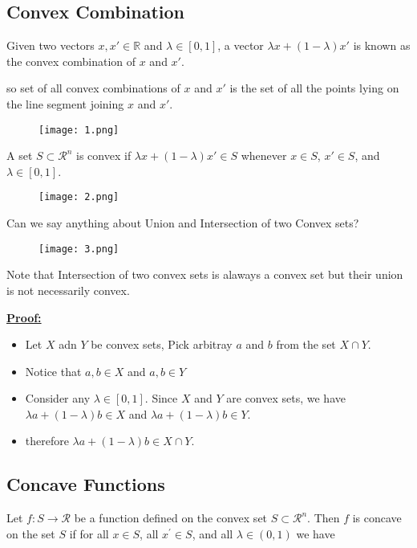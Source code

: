 \documentclass[12pt,a4paper]{article}
\begin{document}
 \subsection{Convex Combination} 
  Given two vectors \(x,x' \in \mathbb{R}\) and \(\lambda \in [0,1]\), a vector \(\lambda x +
  (1-\lambda)x'\) is known as the convex combination of \(x\) and \(x'\).      
 
  so set of all convex combinations of \(x\) and \(x'\) is the set of all the points lying on
  the line segment joining \(x\) and \(x'\).
  
  \begin{figure}[ht]
      \centering
      \texttt{[image: 1.png]}
  \end{figure}
  
  A set \(S \subset \mathcal{R}^n\) is convex if \(\lambda x + (1-\lambda)x' \in S\) whenever 
  \(x \in S\), \(x' \in S\), and \(\lambda \in [0,1]\).
  
  \begin{figure}[ht]
      \centering
      \texttt{[image: 2.png]}
  \end{figure}
  \pagebreak

  Can we say anything about Union and Intersection of two Convex sets?
  \begin{figure}[H]
      \centering
      \texttt{[image: 3.png]}
  \end{figure}

  Note that Intersection of two convex sets is alaways a convex set but their union is not
  necessarily convex.

  \textbf{\underline{Proof:}} 
  \begin{itemize}
    \item Let \(X\) adn \(Y\) be convex sets, Pick arbitray \(a\) and \(b\) from the set \(X 
    \cap Y\).
    \item Notice that \(a,b \in X\) and \(a,b \in Y\)
    \item Consider any \(\lambda \in [0,1]\). Since \(X\) and \(Y\) are convex sets, we have \(\lambda a + (1-\lambda)b \in X\) and \(\lambda a + (1-\lambda)b \in Y\).
    \item therefore \(\lambda a + (1-\lambda)b \in X \cap Y\).  
  \end{itemize}

   \subsection{Concave Functions} 
   Let \(f: S \rightarrow \mathcal{R}\) be a function defined on the convex set \(S \subset \mathcal{R}^n\). Then \(f\) is concave on the set \(S\) if for all \(x \in S\), all \(x^{\prime} \in S\), and all \(\lambda \in(0,1)\) we have
\end{document}
